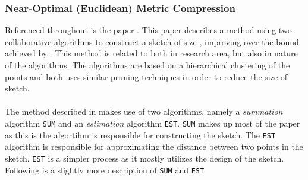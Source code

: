 \subsubsection{Near-Optimal (Euclidean) Metric Compression}
Referenced throughout \cite{wagner17} is the paper \cite{NearO}. This paper describes a method using two collaborative algorithms to construct a sketch of size , improving over the bound achieved by \qs{}. This method is related to \qs{} both in research area, but also in nature of the algorithms. The algorithms are based on a hierarchical clustering of the points and both uses similar pruning techniques in order to reduce the size of sketch.
\\
\\
The method described in \cite{NearO} makes use of two algorithms, namely a \textit{summation} algorithm \texttt{SUM} and an \textit{estimation} algorithm \texttt{EST}. \texttt{SUM} makes up most of the paper as this is the algortihm is responsible for constructing the sketch. The \texttt{EST} algorithm is responsible for approximating the distance between two points in the sketch. \texttt{EST} is a simpler process as it mostly utilizes the design of the sketch. Following is a slightly more description of \texttt{SUM} and \texttt{EST}

